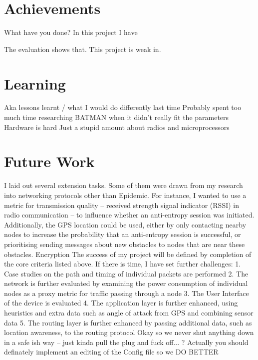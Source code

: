 \documentclass[12pt,a4paper]{report}
\begin{document}
\section{Achievements}
What have you done?
In this project I have 

The evaluation shows that. This project is weak in. 

\section{Learning}
Aka lessons learnt / what I would do differently last time
Probably spent too much time researching BATMAN when it didn't really fit the parameters
Hardware is hard Just a stupid amount about radios and microprocessors

\section{Future Work}
I laid out several extension tasks. Some of them were drawn from my research into networking protocols other than Epidemic. For instance, I wanted to use a metric for transmission quality -- received strength signal indicator (RSSI) in radio communication -- to influence whether an anti-entropy session was initiated. Additionally, the GPS location could be used, either by only contacting nearby nodes to increase the probability that an anti-entropy session is successful, or prioritising sending messages about new obstacles to nodes that are near these obstacles. 
Encryption 
The success of my project will be defined by completion of the core criteria listed above. If there is
time, I have set further challenges:
1. Case studies on the path and timing of individual packets are performed
2. The network is further evaluated by examining the power consumption of individual nodes as
a proxy metric for traffic passing through a node
3. The User Interface of the device is evaluated
4. The application layer is further enhanced, using heuristics and extra data such as angle of
attack from GPS and combining sensor data
5. The routing layer is further enhanced by passing additional data, such as location awareness,
to the routing protocol
Okay so we never shut anything down in a safe ish way -- just kinda pull the plug and fuck off... ? Actually you should definately implement an editing of the Config file so we DO BETTER




\end{document}
